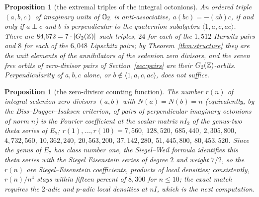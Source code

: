 \documentclass[11pt]{amsart}
\newtheorem{proposition}[theorem]{Proposition}
\theoremstyle{definition}
\begin{document}
\begin{proposition}[the extremal triples of the integral octonions]\label{prop:triples}
An ordered triple $(a,b,c)$ of imaginary units of $\mathbb O_{\mathbb{Z}}$ is anti-associative, $a(bc)=-(ab)c$, if and only if $a\perp c$ and $b$ is perpendicular to the quaternion subalgebra $\langle1,a,c,ac\rangle$. There are $84{,}672=7\cdot|G_2(\mathbb{Z})|$ such triples, $24$ for each of the $1{,}512$ Hurwitz pairs and $8$ for each of the $6{,}048$ Lipschitz pairs; by Theorem~\ref{thm:structure} they are the unit elements of the annihilators of the sedenion zero divisors, and the seven free orbits of zero-divisor pairs of Section~\ref{sec:pairs} are their $G_2(\mathbb{Z})$-orbits. Perpendicularity of $a,b,c$ alone, or $b\notin\langle1,a,c,ac\rangle$, does not suffice.
\end{proposition}
\begin{proposition}[the zero-divisor counting function]\label{prop:count}
The number $r(n)$ of integral sedenion zero divisors $(a,b)$ with $N(a)=N(b)=n$ (equivalently, by the Biss--Dugger--Isaksen criterion, of pairs of perpendicular imaginary octonions of norm $n$) is the Fourier coefficient at the scalar matrix $nI_2$ of the genus-two theta series of $E_7$; $r(1),\dots,r(10)=7{,}560$, $128{,}520$, $685{,}440$, $2{,}305{,}800$, $4{,}732{,}560$, $10{,}362{,}240$, $20{,}563{,}200$, $37{,}142{,}280$, $51{,}445{,}800$, $80{,}453{,}520$. Since the genus of $E_7$ has class number one, the Siegel--Weil formula identifies this theta series with the Siegel Eisenstein series of degree $2$ and weight $7/2$, so the $r(n)$ are Siegel--Eisenstein coefficients, products of local densities; consistently, $r(n)/n^4$ stays within fifteen percent of $8{,}300$ for $n\le10$; the exact match requires the $2$-adic and $p$-adic local densities at $nI$, which is the next computation.
\end{proposition}
\end{document}
